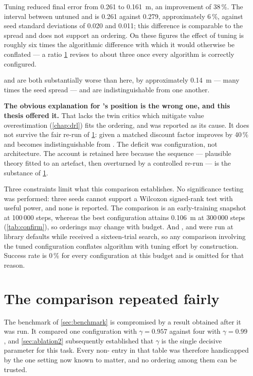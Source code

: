 Tuning \SAC reduced final error from 0.261 to \SI{0.161}{\meter}, an improvement
of 38\,\%. The interval between untuned \SAC and \TDIII is 0.261 against 0.279,
approximately 6\,\%, against seed standard deviations of 0.020 and 0.011; this
difference is comparable to the spread and does not support an ordering. On these
figures the effect of tuning is roughly six times the algorithmic difference with
which it would otherwise be conflated --- a ratio \cref{sec:fairbench} revises to
about three once every algorithm is correctly configured.

\DDPG and \PPO are both substantially worse than \TDIII here, by approximately
\SI{0.14}{\meter} --- many times the seed spread --- and are indistinguishable
from one another.

\textbf{The obvious explanation for \DDPG's position is the wrong one, and this
thesis offered it.} That \DDPG lacks the twin critics which mitigate value
overestimation (\cref{chap:drl}) fits the ordering, and was reported as its
cause. It does not survive the fair re-run of \cref{sec:fairbench}: given a
matched discount factor \DDPG improves by 40\,\% and becomes indistinguishable
from \TDIII. The deficit was configuration, not architecture. The account is
retained here because the sequence --- plausible theory fitted to an artefact,
then overturned by a controlled re-run --- is the substance of
\cref{sec:fairbench}.

Three constraints limit what this comparison establishes. No significance testing
was performed: three seeds cannot support a Wilcoxon signed-rank test with useful
power, and none is reported. The comparison is an early-training snapshot at
100\,000 steps, whereas the best configuration attains \SI{0.106}{\meter} at
300\,000 steps (\cref{tab:confirm}), so orderings may change with budget. And
\TDIII, \DDPG and \PPO were run at library defaults while \SAC received a
sixteen-trial search, so any comparison involving the tuned configuration
conflates algorithm with tuning effort by construction. Success rate is 0\,\% for
every configuration at this budget and is omitted for that reason.


\section{The comparison repeated fairly}
\label{sec:fairbench}

The benchmark of \cref{sec:benchmark} is compromised by a result obtained after
it was run. It compared one configuration with $\gamma = 0.957$ against four with
$\gamma = 0.99$, and \cref{sec:ablation2} subsequently established that $\gamma$
is the single decisive parameter for this task. Every non-\SAC{} entry in that
table was therefore handicapped by the one setting now known to matter, and no
ordering among them can be trusted.

